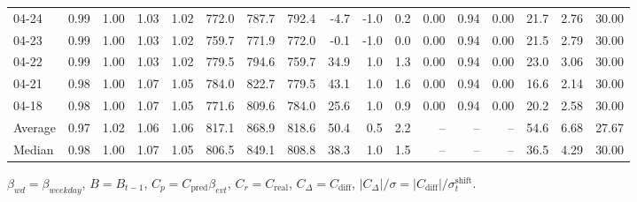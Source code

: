 \begin{threeparttable}
{\begin{tabular}{lrrrrrrrrrrrrrrrr}
  04-24 &         0.99 &           1.00 &          1.03 &          1.02 & 772.0 &  787.7 & 792.4 &       -4.7 &                     -1.0 &                 0.2 &       0.00 &      0.94 &           0.00 &             21.7 &            2.76 &                  30.00 \\
  04-23 &         0.99 &           1.00 &          1.03 &          1.02 & 759.7 &  771.9 & 772.0 &       -0.1 &                     -1.0 &                 0.0 &       0.00 &      0.94 &           0.00 &             21.5 &            2.79 &                  30.00 \\
  04-22 &         0.99 &           1.00 &          1.03 &          1.02 & 779.5 &  794.6 & 759.7 &       34.9 &                      1.0 &                 1.3 &       0.00 &      0.94 &           0.00 &             23.0 &            3.06 &                  30.00 \\
  04-21 &         0.98 &           1.00 &          1.07 &          1.05 & 784.0 &  822.7 & 779.5 &       43.1 &                      1.0 &                 1.6 &       0.00 &      0.94 &           0.00 &             16.6 &            2.14 &                  30.00 \\
  04-18 &         0.98 &           1.00 &          1.07 &          1.05 & 771.6 &  809.6 & 784.0 &       25.6 &                      1.0 &                 0.9 &       0.00 &      0.94 &           0.00 &             20.2 &            2.58 &                  30.00 \\
Average &         0.97 &           1.02 &          1.06 &          1.06 & 817.1 &  868.9 & 818.6 &       50.4 &                      0.5 &                 2.2 &         -- &        -- &             -- &             54.6 &            6.68 &                  27.67 \\
 Median &         0.98 &           1.00 &          1.07 &          1.05 & 806.5 &  849.1 & 808.8 &       38.3 &                      1.0 &                 1.5 &         -- &        -- &             -- &             36.5 &            4.29 &                  30.00 \\
\bottomrule
\end{tabular}
}
\begin{tablenotes}\footnotesize
\item $\beta_{wd}=\beta_{weekday}$, $B=B_{t-1}$,
$C_p=C_{\text{pred}}\beta_{evt}$, $C_r=C_{\text{real}}$,
$C_\Delta=C_{\text{diff}}$, $|C_\Delta|/\sigma=|C_{\text{diff}}|/\sigma_t^{\text{shift}}$.
\end{tablenotes}
\end{threeparttable}
\endgroup
